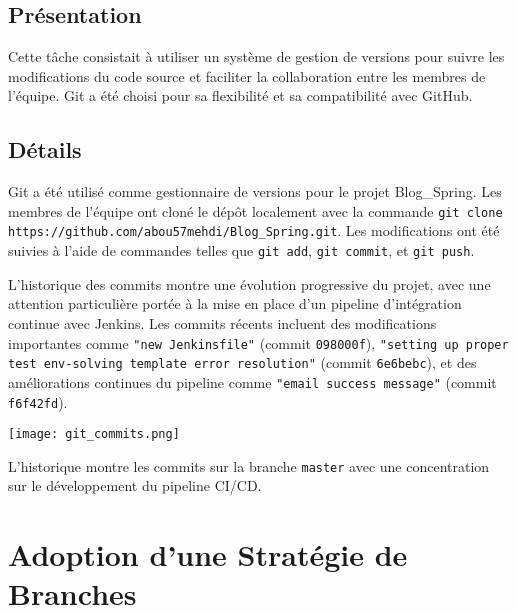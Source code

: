 \subsection{Présentation}
Cette tâche consistait à utiliser un système de gestion de versions pour suivre les modifications du code source et faciliter la collaboration entre les membres de l'équipe. Git a été choisi pour sa flexibilité et sa compatibilité avec GitHub.

\subsection{Détails}
Git a été utilisé comme gestionnaire de versions pour le projet Blog\_Spring. Les membres de l'équipe ont cloné le dépôt localement avec la commande \texttt{git clone https://github.com/abou57mehdi/Blog\_Spring.git}. Les modifications ont été suivies à l'aide de commandes telles que \texttt{git add}, \texttt{git commit}, et \texttt{git push}. 

L'historique des commits montre une évolution progressive du projet, avec une attention particulière portée à la mise en place d'un pipeline d'intégration continue avec Jenkins. Les commits récents incluent des modifications importantes comme \texttt{"new Jenkinsfile"} (commit \texttt{098000f}), \texttt{"setting up proper test env-solving template error resolution"} (commit \texttt{6e6bebc}), et des améliorations continues du pipeline comme \texttt{"email success message"} (commit \texttt{f6f42fd}).

\begin{center}
\begin{minipage}{\textwidth}
  \begin{tcolorbox}[enhanced, colback=lightgray, colframe=accentblue, arc=5pt, boxrule=0.5pt, drop shadow]
    \centering
    \texttt{[image: git\_commits.png]}
    \label{fig:git-commits}
    \vspace{0.5cm}
    \parbox{0.9\textwidth}{\centering L'historique montre les commits sur la branche \texttt{master} avec une concentration sur le développement du pipeline CI/CD.}
  \end{tcolorbox}
\end{minipage}
\end{center}

\section{Adoption d'une Stratégie de Branches}

